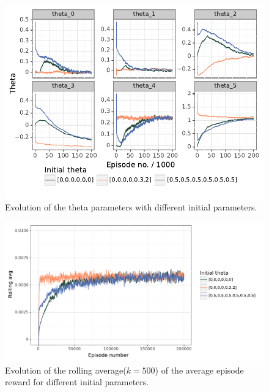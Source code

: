 \documentclass[
  letterpaper,
]{report}
\theoremstyle{plain}
\theoremstyle{definition}
\theoremstyle{definition}
\theoremstyle{remark}
\begin{document}
\begin{figure}

{\centering \includegraphics{./8_implementation_files/figure-pdf/fig-variable_theta-output-1.pdf}

}

\caption{\label{fig-variable_theta}Evolution of the theta parameters
with different initial parameters.}

\end{figure}

\begin{figure}

{\centering \includegraphics{./8_implementation_files/figure-pdf/fig-reward_initial_theta-output-1.pdf}

}

\caption{\label{fig-reward_initial_theta}Evolution of the rolling
average(\(k=500\)) of the average episode reward for different initial
parameters.}

\end{figure}
\end{document}

